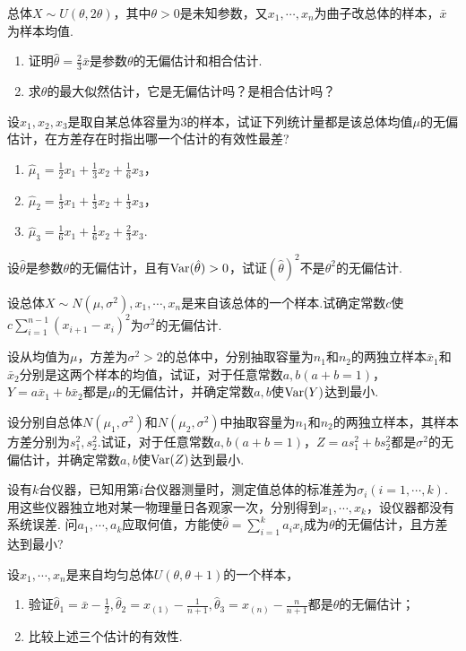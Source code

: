 \begin{xiti}
  \item 总体$X\sim U(\theta,2\theta)$，其中$\theta>0$是未知参数，又$x_1,\cdots,x_n$为曲子改总体的样本，$\bar x$为样本均值.
      \begin{enumerate}
        \item 证明$\hat\theta=\frac23\bar x$是参数$\theta$的无偏估计和相合估计.
        \item 求$\theta$的最大似然估计，它是无偏估计吗？是相合估计吗？
      \end{enumerate}

  \item 设$x_1,x_2,x_3$是取自某总体容量为3的样本，试证下列统计量都是该总体均值$\mu$的无偏估计，在方差存在时指出哪一个估计的有效性最差?
      \begin{enumerate}
        \item $\hat\mu_1=\frac12x_1+\frac13x_2+\frac16x_3$，
        \item $\hat\mu_2=\frac13x_1+\frac13x_2+\frac13x_3$，
        \item $\hat\mu_3=\frac16x_1+\frac16x_2+\frac23x_3$.
      \end{enumerate}

  \item 设$\hat\theta$是参数$\theta$的无偏估计，且有$\operatorname{Var}(\hat\theta)>0$，试证$(\hat\theta)^2$不是$\theta^2$的无偏估计.

  \item 设总体$X\sim N(\mu,\sigma^2),x_1,\cdots,x_n$是来自该总体的一个样本.试确定常数$c$使 $c\sum_{i=1}^{n-1}(x_{i+1}-x_i)^2$为$\sigma^2$的无偏估计.

  \item 设从均值为$\mu$，方差为$\sigma^2>2$的总体中，分别抽取容量为$n_1$和$n_2$的两独立样本$\bar x_1$和$\bar x_2$分别是这两个样本的均值，试证，对于任意常数$a,b(a+b=1)$，$Y=a\bar x_1+b\bar x_2$都是$\mu$的无偏估计，并确定常数$a,b$使$\operatorname{Var}(Y)$达到最小.

  \item 设分别自总体$N(\mu_1,\sigma^2)$和$N(\mu_2,\sigma^2)$中抽取容量为$n_1$和$n_2$的两独立样本，其样本方差分别为$s_1^2,s_2^2$.试证，对于任意常数$a,b(a+b=1)$，$Z=as_1^2+bs_2^2$都是$\sigma^2$的无偏估计，并确定常数$a,b$使$\operatorname{Var}(Z)$达到最小.

  \item 设有$k$台仪器，已知用第$i$台仪器测量时，测定值总体的标准差为$\sigma_i(i=1,\cdots,k)$. 用这些仪器独立地对某一物理量日各观家一次，分别得到$x_1,\cdots,x_k$，设仪器都没有系统误差.
      问$a_1,\cdots,a_k$应取何值，方能使$\hat\theta=\sum_{i=1}^ka_ix_i$成为$\theta$的无偏估计，且方差达到最小?
  \item 设$x_1,\cdots,x_n$是来自均匀总体$U(\theta,\theta+1)$的一个样本，
      \begin{enumerate}
        \item 验证$\hat\theta_1=\bar x-\frac12,\hat\theta_2=x_{(1)}-\frac1{n+1},\hat\theta_3
            =x_{(n)}-\frac n{n+1}$都是$\theta$的无偏估计；
        \item 比较上述三个估计的有效性.
      \end{enumerate}


\end{xiti}
